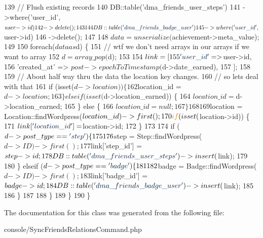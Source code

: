 \begin{DoxyCode}
139             \textcolor{comment}{// Flush existing records}
140             DB::table(\textcolor{stringliteral}{'dma\_friends\_user\_steps'})
141                 ->where(\textcolor{stringliteral}{'user\_id'}, $user->id)
142                 ->delete();
143 
144             DB::table(\textcolor{stringliteral}{'dma\_friends\_badge\_user'})
145                 ->where(\textcolor{stringliteral}{'user\_id'}, $user->id)
146                 ->delete();
147 
148             $data = unserialize($achievement->meta\_value);
149 
150             \textcolor{keywordflow}{foreach}($data as $d) \{
151                 \textcolor{comment}{// wtf we don't need arrays in our arrays if we want to array}
152                 $d = array\_pop($d);
153 
154                 $link = [
155                     \textcolor{stringliteral}{'user\_id'}       => $user->id,
156                     \textcolor{stringliteral}{'created\_at'}    => $post->epochToTimestamp($d->date\_earned),
157                 ];
158 
159                 \textcolor{comment}{// About half way thru the data the location key changes.}
160                 \textcolor{comment}{// so lets deal with that}
161                 \textcolor{keywordflow}{if} (isset($d->location)) \{
162                     $location\_id = $d->location;
163                 \} elseif (isset($d->location\_earned)) \{
164                     $location\_id = $d->location\_earned;
165                 \} \textcolor{keywordflow}{else} \{
166                     $location\_id = null;
167                 \}
168 
169                 $location = Location::findWordpress($location\_id)->first();
170                 \textcolor{keywordflow}{if} (isset($location->id)) \{
171                     $link[\textcolor{stringliteral}{'location\_id'}] = $location->id;
172                 \}
173 
174                 \textcolor{keywordflow}{if} ($d->post\_type == \textcolor{stringliteral}{'step'}) \{
175 
176                     $step = Step::findWordpress($d->ID)->first();
177                     $link[\textcolor{stringliteral}{'step\_id'}] = $step->id;
178                     DB::table(\textcolor{stringliteral}{'dma\_friends\_user\_steps'})->insert($link);
179 
180                 \} elseif ($d->post\_type == \textcolor{stringliteral}{'badge'}) \{
181 
182                     $badge = Badge::findWordpress($d->ID)->first();
183                     $link[\textcolor{stringliteral}{'badge\_id'}] = $badge->id;
184                     DB::table(\textcolor{stringliteral}{'dma\_friends\_badge\_user'})->insert($link);
185 
186                 \}
187         
188             \}
189         \}
190     \}
\end{DoxyCode}


The documentation for this class was generated from the following file\-:\begin{DoxyCompactItemize}
\item 
console/Sync\-Friends\-Relations\-Command.\-php\end{DoxyCompactItemize}
